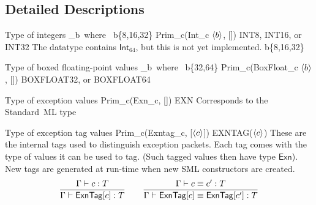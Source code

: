 \documentclass[12pt,twoside,fleqn]{article}
\begin{document}
\irule
  {}
  {}

\irule
  {\qquad
   }
  {}

\subsection{Detailed Descriptions}


\newcommand{\cmilint}[1]{\mathsf{Int}_{#1}}
\newcommand{\cmilfloat}[1]{\mathsf{Float}_{#1}}

  {Type of integers}
  {_b\quad\mbox{\ where\ } b\in\{8,16,32\}}
  {Prim\_c(Int\_c $\langle{b}\rangle$, [])}
  {INT8, INT16, \textrm{or} INT32}
  {The datatype contains $\mathsf{Int}_{64}$, but this is not yet
   implemented.}
  {\irule
    {\validcontext{\context}\qquad b\in\{8,16,32\}}
     {}}

  {Type of boxed floating-point values}
  {_b\quad\mbox{\ where\ } b\in\{32,64\}}
  {Prim\_c(BoxFloat\_c $\langle{b}\rangle$, [])}
  {BOXFLOAT32, \mbox{or} BOXFLOAT64}
  {}
  {\irule
    {\validcontext{\context}}
     {}}

\newcommand{\cexn}{\mathsf{Exn}}
  {Type of exception values}
  {\cexn}
  {Prim\_c(Exn\_c, [])}
  {EXN}
  {Corresponds to the Standard~ML type }
  {\irule
    {\validcontext{\context}}
    {\validconstructor{\context}{\cexn}{\ktype}}}

  {Type of exception tag values}
  {\ctag{\constructor}}
  {Prim\_c(Exntag\_c, [$\langle{c}\rangle$])}
  {EXNTAG($\langle{c}\rangle$)}
  {These are the internal tags used to distinguish exception packets.
   Each tag comes with the type of values it can be used to tag.
   (Such tagged values then have type $\mathsf{Exn}$).  New tags
   are generated at run-time when new SML  constructors
   are created.}
  {\[\frac
    {\Gamma\vdash c : T}
    {\Gamma\vdash \mathsf{ExnTag}[c] : T}
   \qquad
   \frac
    {\Gamma\vdash c \equiv c' : T}
    {\Gamma\vdash \mathsf{ExnTag}[c] \equiv \mathsf{ExnTag}[c'] : T}
  \]}   
\end{document}
